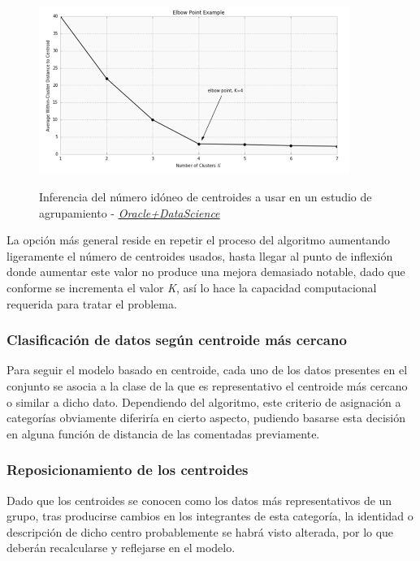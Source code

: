\documentclass[]{report}
\begin{document}
					\begin{figure}[h]
						\centering
						\includegraphics[width=0.9\textwidth]{k-means-oracle.png}
						\label{k-means-elbow-point}
						\caption{Inferencia del número idóneo de centroides a usar en un estudio de agrupamiento - \href{https://www.datascience.com/blog/k-means-clustering}{\textit{Oracle+DataScience}}}
					\end{figure}
					
					La opción más general reside en repetir el proceso del algoritmo aumentando ligeramente el número de centroides usados, hasta llegar al punto de inflexión donde aumentar este valor no produce una mejora demasiado notable, dado que conforme se incrementa el valor \textit{K}, así lo hace la capacidad computacional requerida para tratar el problema.
					
				\subsubsection{Clasificación de datos según centroide más cercano}
				
					Para seguir el modelo basado en centroide, cada uno de los datos presentes en el conjunto se asocia a la clase de la que es representativo el centroide más cercano o similar a dicho dato. Dependiendo del algoritmo, este criterio de asignación a categorías obviamente diferiría en cierto aspecto, pudiendo basarse esta decisión en alguna función de distancia de las comentadas previamente.
				
				\subsubsection{Reposicionamiento de los centroides}
				
					Dado que los centroides se conocen como los datos más representativos de un grupo, tras producirse cambios en los integrantes de esta categoría, la identidad o descripción de dicho centro probablemente se habrá visto alterada, por lo que deberán recalcularse y reflejarse en el modelo.\\
					
\end{document}
